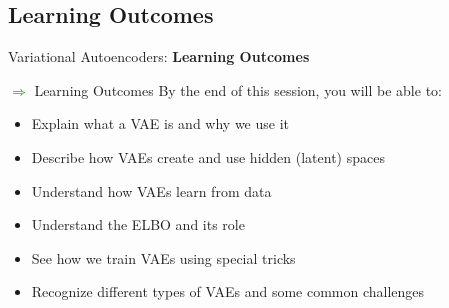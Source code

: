 \subsection{Learning Outcomes}
\begin{frame}{}
    \LARGE Variational Autoencoders: \textbf{Learning Outcomes}
\end{frame}

\begin{frame}[allowframebreaks]{\textcolor{green}{$\Rightarrow$} Learning Outcomes}
    By the end of this session, you will be able to:
    \begin{itemize}
        \item Explain what a VAE is and why we use it
        \item Describe how VAEs create and use hidden (latent) spaces
        \item Understand how VAEs learn from data
        \item Understand the ELBO and its role
        \item See how we train VAEs using special tricks
        \item Recognize different types of VAEs and some common challenges
    \end{itemize}
\end{frame}